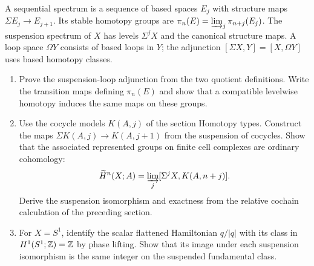 \begin{exercise}
A sequential spectrum is a sequence of based spaces $E_j$ with
structure maps $\Sigma E_j\to E_{j+1}$. Its stable homotopy
groups are $\pi_n(E)=\varinjlim_j\pi_{n+j}(E_j)$.
The suspension spectrum of $X$ has levels $\Sigma^jX$ and the
canonical structure maps. A loop space $\Omega Y$ consists of
based loops in $Y$; the adjunction
$[\Sigma X,Y]=[X,\Omega Y]$ uses based homotopy classes.
\begin{enumerate}[label=(\alph*)]
\item Prove the suspension-loop adjunction from the two quotient
definitions. Write the transition maps defining $\pi_n(E)$
and show that a compatible levelwise homotopy induces the
same maps on these groups.
\item Use the cocycle models $K(A,j)$ of the section Homotopy
types. Construct the maps
$\Sigma K(A,j)\to K(A,j+1)$ from the suspension of cocycles.
Show that the associated represented groups on finite cell
complexes are ordinary cohomology:
\[
 \widetilde H^n(X;A)=
 \varinjlim_j[\Sigma^jX,K(A,n+j)].
\]
Derive the suspension isomorphism and exactness from the
relative cochain calculation of the preceding section.
\item For $X=S^1$, identify the scalar flattened Hamiltonian
$q/|q|$ with its class in $H^1(S^1;\mathbb Z)=\mathbb Z$ by phase lifting.
Show that its image under each suspension isomorphism is
the same integer on the suspended fundamental class.
\end{enumerate}
\end{exercise}

